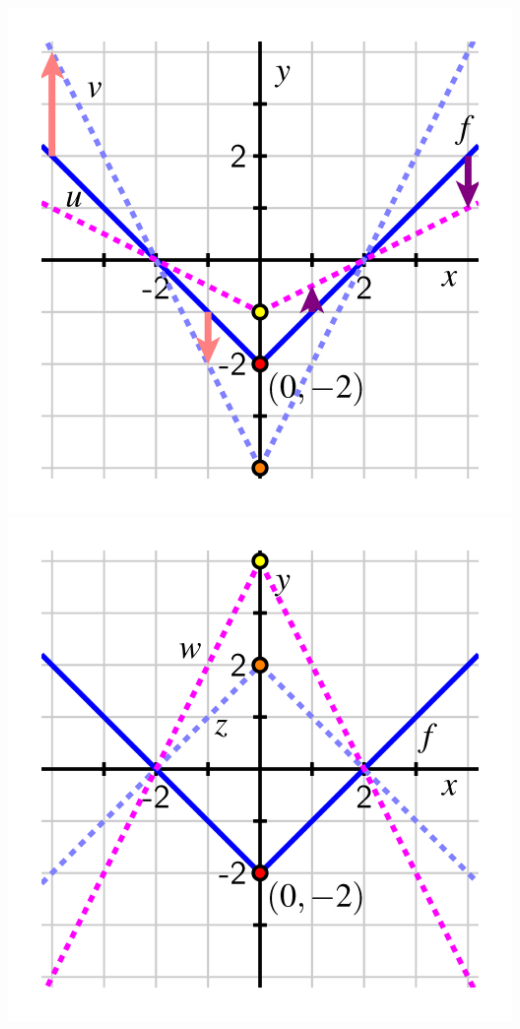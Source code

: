 \documentclass[handout, noauthor, nooutcomes]{ximera}
\begin{document}
\begin{example}
\begin{explanation}
\begin{image}
\includegraphics[width=1\linewidth]{images/transformations-vert-stretch-1.png}
\includegraphics[width=1\linewidth]{images/transformations-vert-stretch-2.png}
\end{image}



\end{explanation}
\end{example}
\end{document}
